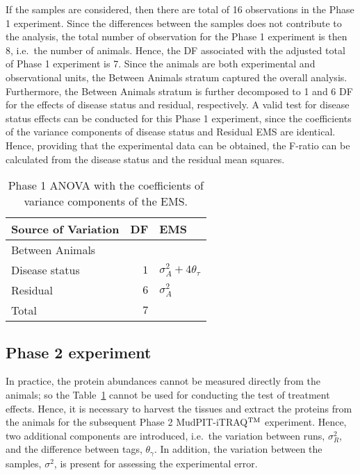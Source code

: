 \documentclass[article]{jss}
\begin{document}
If the samples are considered, then there are total of 16 observations in the Phase 1 experiment. Since the differences between the samples does not contribute to the analysis, the total number of observation for the Phase 1 experiment is then 8, i.e.\ the number of animals. Hence, the DF associated with the adjusted total of Phase 1 experiment is 7. Since the animals are both experimental and observational units, the Between Animals stratum captured the overall analysis. Furthermore, the Between Animals stratum is further decomposed to 1 and 6 DF for the effects of disease status and residual, respectively. A valid test for disease status effects can be conducted for this Phase 1 experiment, since the coefficients of the variance components of disease status and Residual EMS are identical. Hence, providing that the experimental data can be obtained, the F-ratio can be calculated from the disease status and the residual mean squares. 


\begin{table}[ht]
\centering
\caption{Phase 1 ANOVA with the coefficients of variance components of the EMS.}
\begin{tabular}[t]{lrl}
\toprule
\multicolumn{1}{l}{\textbf{Source of Variation}} & \multicolumn{1}{l}{\textbf{DF}} & \multicolumn{1}{l}{\textbf{EMS}}\\
\midrule
Between Animals 		\\
\hspace{3mm}Disease status 	& $1$ 	& $\sigma_{A}^2 + 4\theta_{\tau}$\\
\hspace{3mm}Residual		& $6$ 	& $\sigma_{A}^2$\\\hline
Total 						& $7$    & \\
\bottomrule
\end{tabular}
\label{tab:Phase1ANOVA}
\end{table}

\subsection{Phase 2 experiment}
\label{subsec:Phase2Exp}
In practice, the protein abundances cannot be measured directly from the animals; so the Table~\ref{tab:Phase1ANOVA} cannot be used for conducting the test of treatment effects. Hence, it is necessary to harvest the tissues and extract the proteins from the animals for the subsequent Phase 2 MudPIT-iTRAQ$^{\rm TM}$ experiment. Hence, two additional components are introduced, i.e.\ the variation between runs, $\sigma_{R}^2$, and the difference between tags, $\theta_{\gamma}$. In addition, the variation between the samples, $\sigma^2$, is present for assessing the experimental error. 
\end{document}
